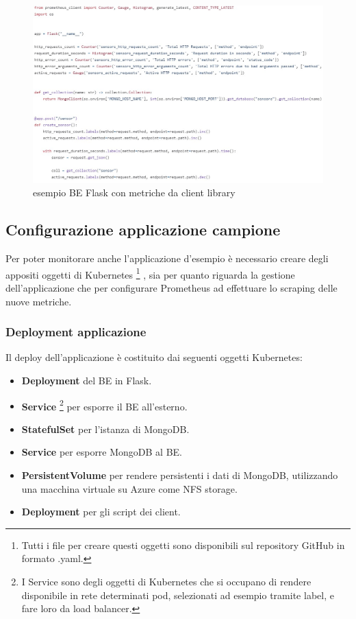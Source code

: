 \begin{figure} [ht]
    \centering
    \includegraphics[width=0.95\linewidth]{UNINA_BSc_Final_Report//img//explanation/controller_example.jpg}
    \caption{esempio BE Flask con metriche da client library}
    \label{fig:flask-be}
\end{figure}

\subsection{Configurazione applicazione campione}
Per poter monitorare anche l'applicazione d'esempio è necessario creare degli appositi oggetti di Kubernetes \footnote{Tutti i file per creare questi oggetti sono disponibili sul repository GitHub \cite{github-repo} in formato .yaml.} , sia per quanto riguarda la gestione dell'applicazione che per configurare Prometheus ad effettuare lo scraping delle nuove metriche.

\subsubsection{Deployment applicazione}
Il deploy dell'applicazione è costituito dai seguenti oggetti Kubernetes:
\begin{itemize}
    \item \textbf{Deployment} del BE in Flask.
    \item \textbf{Service} \footnote{I Service sono degli oggetti di Kubernetes che si occupano di rendere disponibile in rete determinati pod, selezionati ad esempio tramite label, e fare loro da load balancer.} per esporre il BE all'esterno.
    \item \textbf{StatefulSet} per l'istanza di MongoDB.
    \item \textbf{Service} per esporre MongoDB al BE.
    \item \textbf{PersistentVolume} per rendere persistenti i dati di MongoDB, utilizzando una macchina virtuale su Azure come NFS storage.
    \item \textbf{Deployment} per gli script dei client.
\end{itemize}

